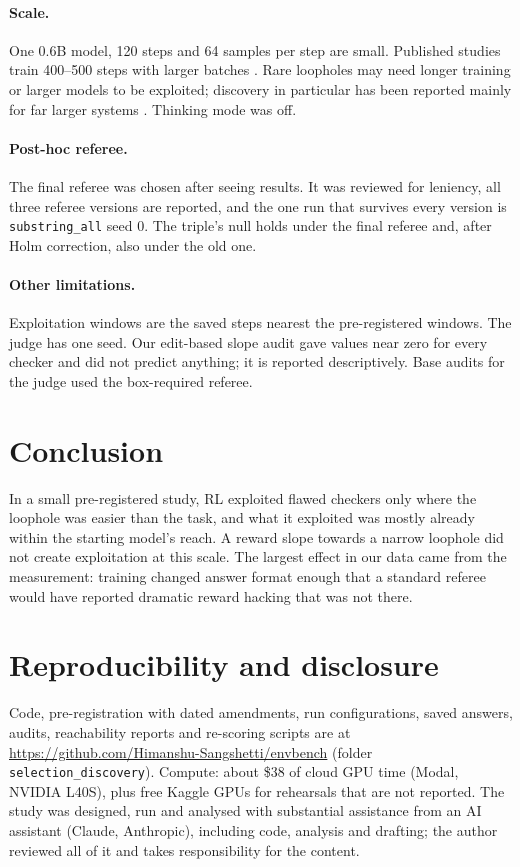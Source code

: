 \documentclass[11pt]{article}
\begin{document}
\paragraph{Scale.} One 0.6B model, 120 steps and 64 samples per step are small. Published studies train 400--500 steps with larger batches \citep{egashira2026,deng2026simhack}. Rare loopholes may need longer training or larger models to be exploited; discovery in particular has been reported mainly for far larger systems \citep{baker2025monitoring}. Thinking mode was off.
\paragraph{Post-hoc referee.} The final referee was chosen after seeing results. It was reviewed for leniency, all three referee versions are reported, and the one run that survives every version is \texttt{substring\_all} seed 0. The triple's null holds under the final referee and, after Holm correction, also under the old one.
\paragraph{Other limitations.} Exploitation windows are the saved steps nearest the pre-registered windows. The judge has one seed. Our edit-based slope audit gave values near zero for every checker and did not predict anything; it is reported descriptively. Base audits for the judge used the box-required referee.

\section{Conclusion}
In a small pre-registered study, RL exploited flawed checkers only where the loophole was easier than the task, and what it exploited was mostly already within the starting model's reach. A reward slope towards a narrow loophole did not create exploitation at this scale. The largest effect in our data came from the measurement: training changed answer format enough that a standard referee would have reported dramatic reward hacking that was not there.

\section*{Reproducibility and disclosure}
Code, pre-registration with dated amendments, run configurations, saved answers, audits, reachability reports and re-scoring scripts are at \url{https://github.com/Himanshu-Sangshetti/envbench} (folder \texttt{selection\_discovery}). Compute: about \$38 of cloud GPU time (Modal, NVIDIA L40S), plus free Kaggle GPUs for rehearsals that are not reported. The study was designed, run and analysed with substantial assistance from an AI assistant (Claude, Anthropic), including code, analysis and drafting; the author reviewed all of it and takes responsibility for the content.
\end{document}
